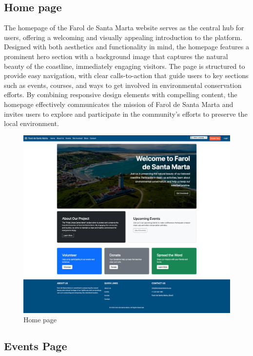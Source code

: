 \subsection{Home page}

The homepage of the Farol de Santa Marta website serves as the central hub for users, offering a welcoming and visually appealing introduction to the platform. Designed with both aesthetics and functionality in mind, the homepage features a prominent hero section with a background image that captures the natural beauty of the coastline, immediately engaging visitors. The page is structured to provide easy navigation, with clear calls-to-action that guide users to key sections such as events, courses, and ways to get involved in environmental conservation efforts. By combining responsive design elements with compelling content, the homepage effectively communicates the mission of Farol de Santa Marta and invites users to explore and participate in the community's efforts to preserve the local environment.

\begin{figure}[H]
    \centering
    \includegraphics[width=1\linewidth]{images/home-page.png}
    \caption{Home page}
    \label{fig:Home page}
\end{figure}

\subsection{Events Page}

